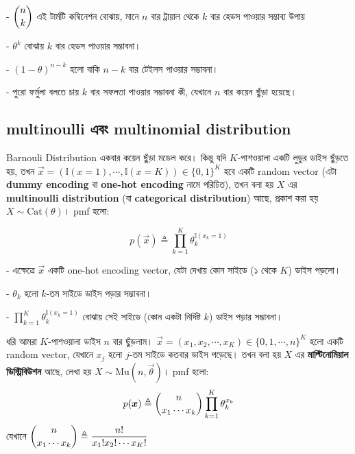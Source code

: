 \documentclass[graybox, envcountchap, twocolumn]{styles/svmult}
\begin{document}
\bengalifont
- $\dbinom{n}{k}$ এই টার্মটি কম্বিনেশন বোঝায়, মানে $n$ বার ট্রায়াল থেকে $k$ বার হেডস পাওয়ার সম্ভাব্য উপায়

- $\theta^k$ বোঝায় $k$ বার হেডস পাওয়ার সম্ভাবনা।

- $(1-\theta)^{n-k}$ হলো বাকি $n-k$ বার টেইলস পাওয়ার সম্ভাবনা।

- পুরো ফর্মুলা বলতে চায় $k$ বার সফলতা পাওয়ার সম্ভাবনা কী, যেখানে $n$ বার কয়েন ছুঁড়া হয়েছে।

\subsection{{\bengalifont multinoulli এবং multinomial distribution}}

\begin{definition}
\bengalifont
Barnouli Distribution একবার কয়েন ছুঁড়া মডেল করে। কিন্তু যদি $K$-পাশওয়ালা একটি লুডুর ডাইস ছুঁড়তে হয়, তখন $\vec{x} =(\mathbb{I}(x=1),\cdots,\mathbb{I}(x=K)) \in \{0,1\}^K$ হবে একটি random vector (এটা \textbf{dummy encoding} বা \textbf{one-hot encoding} নামে পরিচিত), তখন বলা হয় $X$ এর \textbf{multinoulli distribution} (বা \textbf{categorical distribution}) আছে, প্রকাশ করা হয় $X \sim \text{Cat}(\theta)$। pmf হলো:

\begin{equation}
p(\vec{x}) \triangleq \prod\limits_{k=1}^K\theta_k^{\mathbb{I}(x_k=1)}
\end{equation}
\end{definition}

\bengalifont
- এক্ষেত্রে $\vec{x}$ একটি one-hot encoding vector, যেটা দেখায় কোন সাইডে (১ থেকে $K$) ডাইস পড়লো।

- $\theta_k$ হলো $k$-তম সাইডে ডাইস পড়ার সম্ভাবনা।

- $\prod\limits_{k=1}^K\theta_k^{\mathbb{I}(x_k=1)}$ বোঝায় সেই সাইডে (কোন একটা নির্দিষ্ট $k$) ডাইস পড়ার সম্ভাবনা।

\begin{definition}
\bengalifont
ধরি আমরা $K$-পাশওয়ালা ডাইস $n$ বার ছুঁড়লাম। $\vec{x} =(x_1,x_2,\cdots,x_K) \in \{0,1,\cdots,n\}^K$ হলো একটি random vector, যেখানে $x_j$ হলো $j$-তম সাইডে কতবার ডাইস পড়েছে। তখন বলা হয় $X$ এর \textbf{মাল্টিনোমিয়াল ডিস্ট্রিবিউশন} আছে, লেখা হয় $X \sim \text{Mu}(n, \vec{\theta})$। pmf হলো:
\begin{equation}\label{eqn:multinomial-pmf}
p(\vec{x}) \triangleq \dbinom{n}{x_1 \cdots x_k} \prod\limits_{k=1}^K\theta_k^{x_k}
\end{equation}
যেখানে $\dbinom{n}{x_1 \cdots x_k} \triangleq \dfrac{n!}{x_1!x_2! \cdots x_K!}$
\end{definition}
\end{document}
